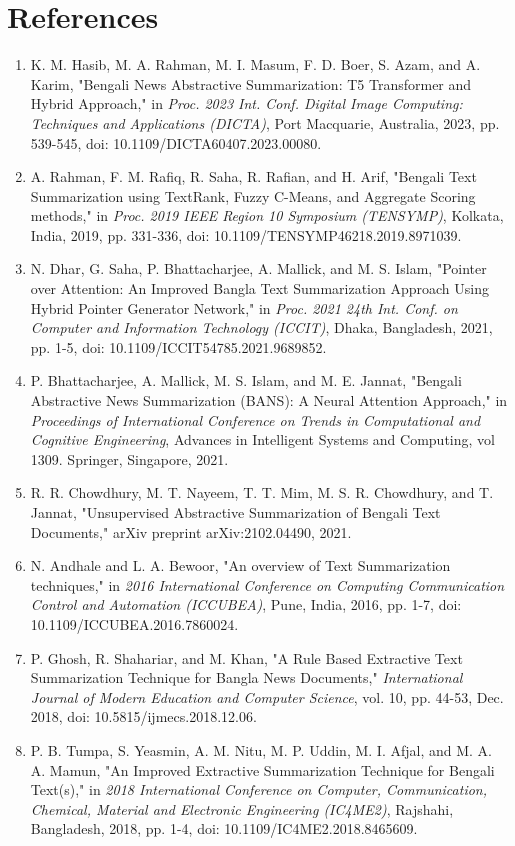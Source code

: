 \documentclass[12pt]{report}
\begin{document}
\section*{References}
\begin{enumerate}
    \item K. M. Hasib, M. A. Rahman, M. I. Masum, F. D. Boer, S. Azam, and A. Karim, "Bengali News Abstractive Summarization: T5 Transformer and Hybrid Approach," in \textit{Proc. 2023 Int. Conf. Digital Image Computing: Techniques and Applications (DICTA)}, Port Macquarie, Australia, 2023, pp. 539-545, doi: 10.1109/DICTA60407.2023.00080.
    \item A. Rahman, F. M. Rafiq, R. Saha, R. Rafian, and H. Arif, "Bengali Text Summarization using TextRank, Fuzzy C-Means, and Aggregate Scoring methods," in \textit{Proc. 2019 IEEE Region 10 Symposium (TENSYMP)}, Kolkata, India, 2019, pp. 331-336, doi: 10.1109/TENSYMP46218.2019.8971039.
    \item N. Dhar, G. Saha, P. Bhattacharjee, A. Mallick, and M. S. Islam, "Pointer over Attention: An Improved Bangla Text Summarization Approach Using Hybrid Pointer Generator Network," in \textit{Proc. 2021 24th Int. Conf. on Computer and Information Technology (ICCIT)}, Dhaka, Bangladesh, 2021, pp. 1-5, doi: 10.1109/ICCIT54785.2021.9689852.
    \item P. Bhattacharjee, A. Mallick, M. S. Islam, and M. E. Jannat, "Bengali Abstractive News Summarization (BANS): A Neural Attention Approach," in \textit{Proceedings of International Conference on Trends in Computational and Cognitive Engineering}, Advances in Intelligent Systems and Computing, vol 1309. Springer, Singapore, 2021.
    \item R. R. Chowdhury, M. T. Nayeem, T. T. Mim, M. S. R. Chowdhury, and T. Jannat, "Unsupervised Abstractive Summarization of Bengali Text Documents," arXiv preprint arXiv:2102.04490, 2021.
    \item N. Andhale and L. A. Bewoor, "An overview of Text Summarization techniques," in \textit{2016 International Conference on Computing Communication Control and Automation (ICCUBEA)}, Pune, India, 2016, pp. 1-7, doi: 10.1109/ICCUBEA.2016.7860024.
    \item P. Ghosh, R. Shahariar, and M. Khan, "A Rule Based Extractive Text Summarization Technique for Bangla News Documents," \textit{International Journal of Modern Education and Computer Science}, vol. 10, pp. 44-53, Dec. 2018, doi: 10.5815/ijmecs.2018.12.06.
    \item P. B. Tumpa, S. Yeasmin, A. M. Nitu, M. P. Uddin, M. I. Afjal, and M. A. A. Mamun, "An Improved Extractive Summarization Technique for Bengali Text(s)," in \textit{2018 International Conference on Computer, Communication, Chemical, Material and Electronic Engineering (IC4ME2)}, Rajshahi, Bangladesh, 2018, pp. 1-4, doi: 10.1109/IC4ME2.2018.8465609.
\end{enumerate}
\end{document}

